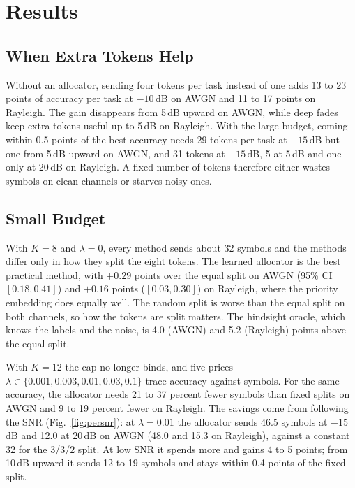 
\section{Results}
\label{sec:results}

\subsection{When Extra Tokens Help}
\label{ssec:saturation}

Without an allocator, sending four tokens per task instead of one adds
13 to 23 points of accuracy per task at $-10$\,dB on AWGN and 11 to 17
points on Rayleigh. The gain disappears from 5\,dB upward on AWGN,
while deep fades keep extra tokens useful up to 5\,dB on Rayleigh. With
the large budget, coming within 0.5 points of the best accuracy needs
29 tokens per task at $-15$\,dB but one from 5\,dB upward on AWGN, and
31 tokens at $-15$\,dB, 5 at 5\,dB and one only at 20\,dB on Rayleigh.
A fixed number of tokens therefore either wastes symbols on clean
channels or starves noisy ones.

\subsection{Small Budget}
\label{ssec:small}

With $K{=}8$ and $\lambda{=}0$, every method sends about 32 symbols and
the methods differ only in how they split the eight tokens. The learned
allocator is the best practical method, with $+0.29$ points over the
equal split on AWGN (95\% CI $[0.18, 0.41]$) and $+0.16$ points
($[0.03, 0.30]$) on Rayleigh, where the priority embedding does equally
well. The random split is worse than the equal split on both channels,
so how the tokens are split matters. The hindsight oracle, which knows
the labels and the noise, is 4.0 (AWGN) and 5.2 (Rayleigh) points above
the equal split.

With $K{=}12$ the cap no longer binds, and five prices
$\lambda \in \{0.001, 0.003, 0.01, 0.03, 0.1\}$ trace accuracy against
symbols. For the same accuracy, the allocator needs 21 to 37 percent
fewer symbols than fixed splits on AWGN and 9 to 19 percent fewer on
Rayleigh. The savings come from following the SNR
(Fig.~\ref{fig:persnr}): at $\lambda{=}0.01$ the allocator sends 46.5
symbols at $-15$\,dB and 12.0 at 20\,dB on AWGN (48.0 and 15.3 on
Rayleigh), against a constant 32 for the 3/3/2 split. At low SNR it
spends more and gains 4 to 5 points; from 10\,dB upward it sends 12 to
19 symbols and stays within 0.4 points of the fixed split.

